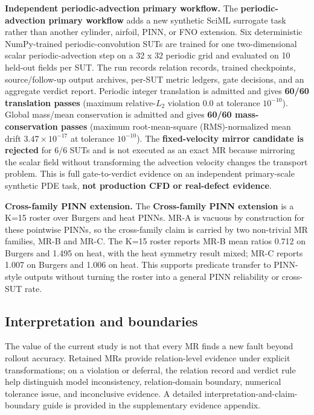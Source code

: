 \documentclass[preprint,12pt]{elsarticle}
\begin{document}
\textbf{Independent periodic-advection primary workflow.} The \textbf{periodic-advection primary workflow} adds a new synthetic SciML surrogate task rather than another cylinder, airfoil, PINN, or FNO extension. Six deterministic NumPy-trained periodic-convolution SUTs are trained for one two-dimensional scalar periodic-advection step on a 32 x 32 periodic grid and evaluated on 10 held-out fields per SUT. The run records relation records, trained checkpoints, source/follow-up output archives, per-SUT metric ledgers, gate decisions, and an aggregate verdict report. Periodic integer translation is admitted and gives \textbf{60/60 translation passes} (maximum relative-\(L_2\) violation 0.0 at tolerance $10^{-10}$). Global mass/mean conservation is admitted and gives \textbf{60/60 mass-conservation passes} (maximum root-mean-square (RMS)-normalized mean drift $3.47\times10^{-17}$ at tolerance $10^{-10}$). The \textbf{fixed-velocity mirror candidate is rejected} for 6/6 SUTs and is not executed as an exact MR because mirroring the scalar field without transforming the advection velocity changes the transport problem. This is full gate-to-verdict evidence on an independent primary-scale synthetic PDE task, \textbf{not production CFD or real-defect evidence}.

\textbf{Cross-family PINN extension.} The \textbf{Cross-family PINN extension} is a K=15 roster over Burgers and heat PINNs. MR-A is vacuous by construction for these pointwise PINNs, so the cross-family claim is carried by two non-trivial MR families, MR-B and MR-C. The K=15 roster reports MR-B mean ratios 0.712 on Burgers and 1.495 on heat, with the heat symmetry result mixed; MR-C reports 1.007 on Burgers and 1.006 on heat. This supports predicate transfer to PINN-style outputs without turning the roster into a general PINN reliability or cross-SUT rate.

\subsection{Interpretation and boundaries}
\label{sec:discussion}
\label{subsec:still-blocked}
\label{subsec:scoped-interpretation}

The value of the current study is not that every MR finds a new fault beyond rollout accuracy. Retained MRs provide relation-level evidence under explicit transformations; on a violation or deferral, the relation record and verdict rule help distinguish model inconsistency, relation-domain boundary, numerical tolerance issue, and inconclusive evidence. A detailed interpretation-and-claim-boundary guide is provided in the supplementary evidence appendix.
\end{document}
